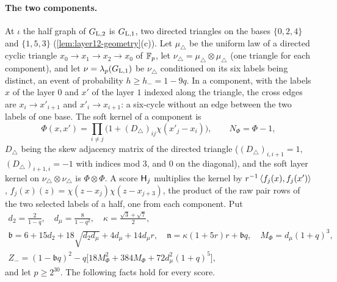 \paragraph{The two components.}
At $\iota$ the half graph of $G_{\rm L,2}$ is $G_{\rm L,1}$, two directed triangles on the
bases $\{0,2,4\}$ and $\{1,5,3\}$ (\cref{lem:layer12-geometry}(c)). Let $\mu_\triangle$ be the
uniform law of a directed cyclic triangle $x_0\to x_1\to x_2\to x_0$ of $\mathbb F_p$, let
$\nu_\triangle=\mu_\triangle\otimes\mu_\triangle$ (one triangle for each component), and let
$\nu=\lambda_p(G_{\rm L,1})$ be $\nu_\triangle$ conditioned on its six labels being distinct,
an event of probability $h\ge h_-=1-9q$. In a component, with the labels $x$ of the layer
$0$ and $x'$ of the layer $1$ indexed along the triangle, the cross edges are
$x_i\to x'_{i+1}$ and $x'_i\to x_{i+1}$: a six-cycle without an edge between the two labels
of one base. The soft kernel of a component is
\[
 \Phi(x,x')=\prod_{i\ne j}\bigl(1+(D_\triangle)_{ij}\chi(x'_j-x_i)\bigr),\qquad
 N_\Phi=\Phi-1,
\]
$D_\triangle$ being the skew adjacency matrix of the directed triangle
($(D_\triangle)_{i,i+1}=1$, $(D_\triangle)_{i+1,i}=-1$ with indices mod $3$, and
$0$ on the diagonal), and the soft layer
kernel on $\nu_\triangle\otimes\nu_\triangle$ is $\Phi\otimes\Phi$. A score $\mathsf H_{j}$ multiplies the
kernel by $r^{-1}\left\langle f_j(x),f_j(x')\right\rangle$, $f_j(x)(z)=\chi(z-x_j)\chi(z-x_{j+3})$, the product of
the raw pair rows of the two selected labels of a half, one from each component. Put
\begin{gather*}
 d_2=\frac2{1-q},\quad d_\mu=\frac8{1-q^2},\quad
 \kappa=\frac{\sqrt3+\sqrt7}2,\\
 \mathfrak b=6+15d_2+18\sqrt{d_2d_\mu}+4d_\mu+14d_\mu r,\quad
 \mathfrak n=\kappa(1+5r)r+\mathfrak bq,\quad M_\Phi=d_\mu(1+q)^3,\\
 Z_-=(1-\mathfrak bq)^2-q\bigl[18M_\Phi^2+384M_\Phi+72d_\mu^2(1+q)^5\bigr],
\end{gather*}
and let $p\ge2^{30}$. The following facts hold for every score.
